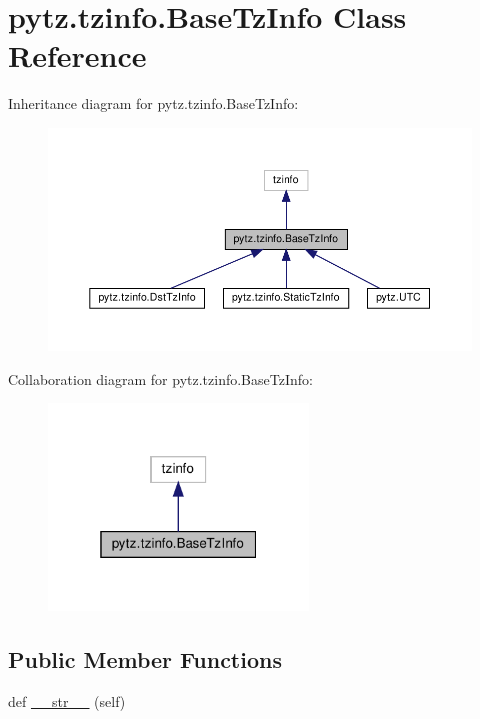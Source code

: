 \hypertarget{classpytz_1_1tzinfo_1_1BaseTzInfo}{}\section{pytz.\+tzinfo.\+Base\+Tz\+Info Class Reference}
\label{classpytz_1_1tzinfo_1_1BaseTzInfo}


Inheritance diagram for pytz.\+tzinfo.\+Base\+Tz\+Info\+:
\nopagebreak
\begin{figure}[H]
\begin{center}
\leavevmode
\includegraphics[width=350pt]{classpytz_1_1tzinfo_1_1BaseTzInfo__inherit__graph}
\end{center}
\end{figure}


Collaboration diagram for pytz.\+tzinfo.\+Base\+Tz\+Info\+:
\nopagebreak
\begin{figure}[H]
\begin{center}
\leavevmode
\includegraphics[width=196pt]{classpytz_1_1tzinfo_1_1BaseTzInfo__coll__graph}
\end{center}
\end{figure}
\subsection*{Public Member Functions}
\begin{DoxyCompactItemize}
\item 
def \hyperlink{classpytz_1_1tzinfo_1_1BaseTzInfo_ae685bcd142606e3683c3d93acec10019}{\+\_\+\+\_\+str\+\_\+\+\_\+} (self)
\end{DoxyCompactItemize}
